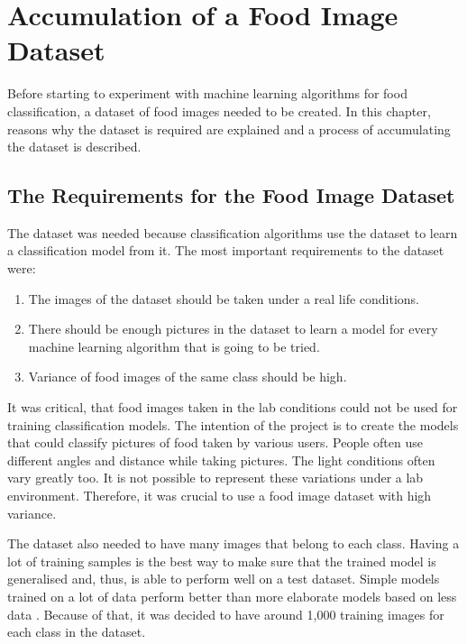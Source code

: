 \chapter{Accumulation of a Food Image Dataset}

Before starting to experiment with machine learning algorithms for food classification, a dataset of food images needed to be created. In this chapter, reasons why the dataset is required are  explained and a process of accumulating the dataset is described.

\section{The Requirements for the Food Image Dataset}
 The dataset was needed because classification algorithms use the dataset to learn a classification model from it. The most important requirements to the dataset were:

\begin{enumerate}
  \item The images of the dataset should be taken under a real life conditions.
  \item There should be enough pictures in the dataset to learn a model for every machine learning algorithm that is going to be tried.
  \item Variance of food images of the same class should be high. 
\end{enumerate}

 
 It was critical, that food images taken in the lab conditions could not be used for training classification models. The intention of the project is to create the  models that could classify pictures of food taken by various users. People often use different angles and distance while taking pictures. The light conditions often vary greatly too. It is not possible to represent these variations under a lab environment. Therefore, it was crucial to use a food image dataset with high variance.

The dataset also needed to have many images that belong to each class. Having a lot of training samples is the best way to make sure that  the trained model is generalised and, thus, is able to  perform well on a test dataset. Simple models trained on a lot of data perform better than more elaborate models based on less data \citep{unreasonable}. Because of that, it was decided to have around  1,000 training images for each class in the dataset. 

